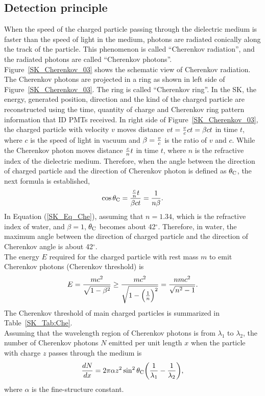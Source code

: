 \subsection{Detection principle}
\vs\hs When the speed of the charged particle passing through the dielectric medium is faster than the speed of light in the medium, photons are radiated conically along the track of the particle.
This phenomenon is called ``Cherenkov radiation'', and the radiated photons are called ``Cherenkov photons''.
Figure~\ref{SK_Cherenkov_03} shows the schematic view of Cherenkov radiation.
The Cherenkov photons are projected in a ring as shown in left side of Figure~\ref{SK_Cherenkov_03}.
The ring is called ``Cherenkov ring''.
In the SK, the energy, generated position, direction and the kind of the charged particle are reconstructed using the time, quantity of charge and Cherenkov ring pattern information that ID PMTs received.
In right side of Figure~\ref{SK_Cherenkov_03}, the charged particle with velocity $v$ moves distance $vt={v \over c}ct=\beta ct$ in time $t$, where $c$ is the speed of light in vacuum and $\beta={v \over c}$ is the ratio of $v$ and $c$.
While the Cherenkov photon moves distance ${c \over n}t$ in time $t$, where $n$ is the refractive index of the dielectric medium.
Therefore, when the angle between the direction of charged particle and the direction of Cherenkov photon is defined as $\theta_{{\rm C}}$, the next formula is established,
\begin{eqnarray}\label{SK_Eq_Che}
	\cos\theta_{{\rm C}}={{c \over n}t \over \beta ct}={1 \over n\beta}.
\end{eqnarray}
In Equation (\ref{SK_Eq_Che}), assuming that $n=1.34$, which is the refractive index of water, and $\beta=1$, $\theta_{{\rm C}}$ becomes about 42$^{\circ}$.
Therefore, in water, the maximum angle between the direction of charged particle and the direction of Cherenkov angle is about 42$^{\circ}$.\\
\hs The energy $E$ required for the charged particle with rest mass $m$ to emit Cherenkov photons (Cherenkov threshold) is
\begin{eqnarray}
	E={mc^{2} \over \sqrt{1-\beta^{2}}}\geq{mc^{2} \over \sqrt{1-\Big({1 \over n}\Big)^{2}}}={nmc^{2} \over \sqrt{n^{2}-1}}.
\end{eqnarray}
The Cherenkov threshold of main charged particles is summarized in Table~\ref{SK_Tab:Che}.\\
\hs Assuming that the wavelength region of Cherenkov photons is from $\lambda_{1}$ to $\lambda_{2}$, the number of Cherenkov photons $N$ emitted per unit length $x$ when the particle with charge $z$ passes through the medium is
\begin{eqnarray}
	{dN \over dx}=2\pi\alpha z^{2}\sin ^{2} \theta_{{\rm C}}\bigg({1 \over \lambda_{1}}-{1 \over \lambda_{2}}\bigg),
\end{eqnarray}
where $\alpha$ is the fine-structure constant.

